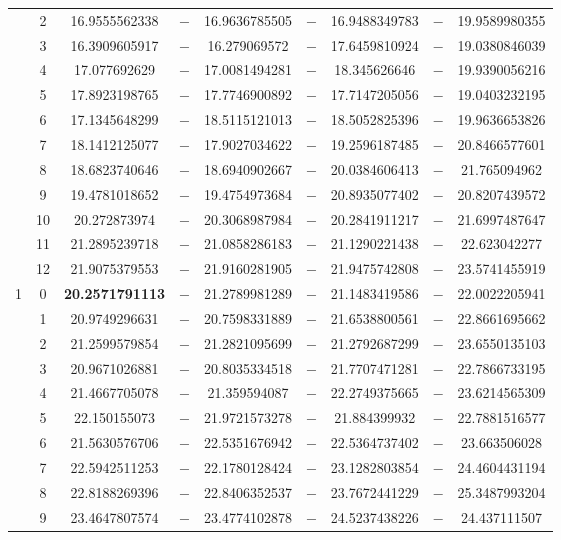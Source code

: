 \begin{table}[ht]
{\begin{tabular}{c|c|c|c|c|c|c|c|c}
& 2 & 16.9555562338& $-$& 16.9636785505& $-$& 16.9488349783& $-$& 19.9589980355\\ 
& 3 & 16.3909605917& $-$& 16.279069572& $-$& 17.6459810924& $-$& 19.0380846039\\ 
& 4 & 17.077692629& $-$& 17.0081494281& $-$& 18.345626646& $-$& 19.9390056216\\ 
& 5 & 17.8923198765& $-$& 17.7746900892& $-$& 17.7147205056& $-$& 19.0403232195\\ 
& 6 & 17.1345648299& $-$& 18.5115121013& $-$& 18.5052825396& $-$& 19.9636653826\\ 
& 7 & 18.1412125077& $-$& 17.9027034622& $-$& 19.2596187485& $-$& 20.8466577601\\ 
& 8 & 18.6823740646& $-$& 18.6940902667& $-$& 20.0384606413& $-$& 21.765094962\\ 
& 9 & 19.4781018652& $-$& 19.4754973684& $-$& 20.8935077402& $-$& 20.8207439572\\ 
& 10 & 20.272873974& $-$& 20.3068987984& $-$& 20.2841911217& $-$& 21.6997487647\\ 
& 11 & 21.2895239718& $-$& 21.0858286183& $-$& 21.1290221438& $-$& 22.623042277\\ 
& 12 & 21.9075379553& $-$& 21.9160281905& $-$& 21.9475742808& $-$& 23.5741455919\\ 
\hline                    %
\multirow{13}{*}{1} & 0 & \textbf{20.2571791113}& $-$& 21.2789981289& $-$& 21.1483419586& $-$& 22.0022205941\\ 
& 1 & 20.9749296631& $-$& 20.7598331889& $-$& 21.6538800561& $-$& 22.8661695662\\ 
& 2 & 21.2599579854& $-$& 21.2821095699& $-$& 21.2792687299& $-$& 23.6550135103\\ 
& 3 & 20.9671026881& $-$& 20.8035334518& $-$& 21.7707471281& $-$& 22.7866733195\\ 
& 4 & 21.4667705078& $-$& 21.359594087& $-$& 22.2749375665& $-$& 23.6214565309\\ 
& 5 & 22.150155073& $-$& 21.9721573278& $-$& 21.884399932& $-$& 22.7881516577\\ 
& 6 & 21.5630576706& $-$& 22.5351676942& $-$& 22.5364737402& $-$& 23.663506028\\ 
& 7 & 22.5942511253& $-$& 22.1780128424& $-$& 23.1282803854& $-$& 24.4604431194\\ 
& 8 & 22.8188269396& $-$& 22.8406352537& $-$& 23.7672441229& $-$& 25.3487993204\\ 
& 9 & 23.4647807574& $-$& 23.4774102878& $-$& 24.5237438226& $-$& 24.437111507\\ 

\end{tabular}}
\end{table}
